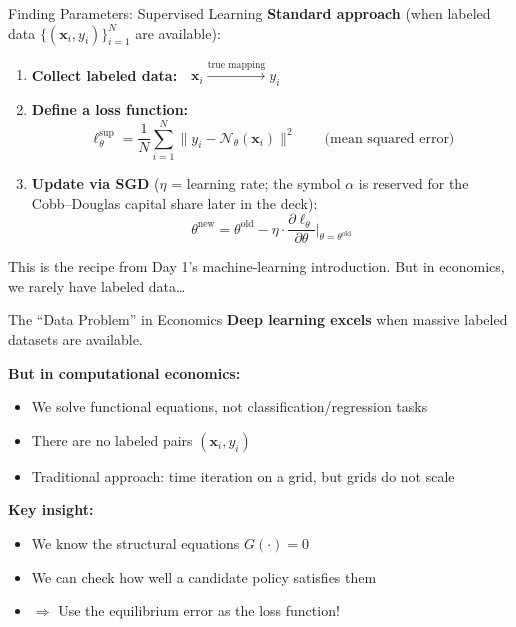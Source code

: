 \documentclass[aspectratio=169,11pt]{beamer}
\newcommand{\emphc}[1]{\textcolor{harvardcrimson}{#1}}
\newcommand{\x}{\bm{x}}
\begin{document}
\begin{frame}{Finding Parameters: Supervised Learning}
\textbf{Standard approach} (when labeled data $\{(\x_i, y_i)\}_{i=1}^N$ are available):

\vspace{0.5em}
\begin{enumerate}
    \item \textbf{Collect labeled data:}~~$\x_i \xrightarrow{\text{true mapping}} y_i$

    \vspace{0.3em}
    \item \textbf{Define a loss function:}
    \[
    \ell_\theta^{\text{sup}} = \frac{1}{N}\sum_{i=1}^{N} \bigl\|y_i - \mathcal{N}_\theta(\x_i)\bigr\|^2
    \qquad\text{(mean squared error)}
    \]

    \vspace{0.3em}
    \item \textbf{Update via SGD} ($\eta$ = learning rate; the symbol $\alpha$ is reserved for the Cobb--Douglas capital share later in the deck):
    \[
    \theta^{\text{new}} = \theta^{\text{old}} - \eta \cdot \frac{\partial \ell_\theta}{\partial \theta}\bigg|_{\theta = \theta^{\text{old}}}
    \]
\end{enumerate}

\vspace{0.3em}
{\small This is the recipe from Day 1's machine-learning introduction. But in economics, \emphc{we rarely have labeled data}\ldots}
\end{frame}

\begin{frame}{The ``Data Problem'' in Economics}
\textbf{Deep learning excels} when massive labeled datasets are available.

\vspace{0.5em}
\textbf{But in computational economics:}
\begin{itemize}
    \item We solve \emphc{functional equations}, not classification/regression tasks
    \item There are \emphc{no labeled pairs} $(\x_i, y_i)$
    \item Traditional approach: \emphc{time iteration on a grid}, but grids do not scale
\end{itemize}

\vspace{0.5em}
\textbf{Key insight:}
\begin{itemize}
    \item We \emphc{know} the structural equations $G(\cdot) = 0$
    \item We can \emphc{check} how well a candidate policy satisfies them
    \item $\Rightarrow$ Use the \emphc{equilibrium error} as the loss function!
\end{itemize}
\end{frame}
\end{document}

